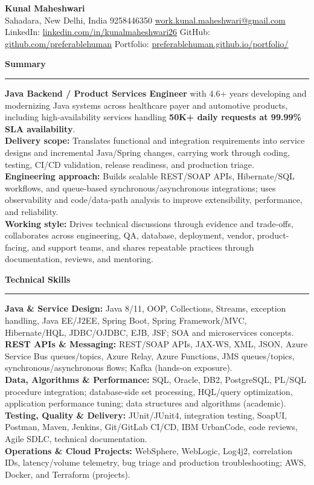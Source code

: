 \documentclass[11pt,letterpaper]{article}
\newcommand{\ressection}[1]{\Needspace{6\baselineskip}\vspace{8pt}\par\textbf{#1}\par\vspace{2pt}\hrule\vspace{5pt}}
\begin{document}
\pagestyle{empty}\raggedright\fontsize{11}{12.5}\selectfont

{\Large \textbf{Kunal Maheshwari}}\\
Sahadara, New Delhi, India \textbar{} 9258446350 \textbar{} \href{mailto:work.kunal.maheshwari@gmail.com}{work.kunal.maheshwari@gmail.com}\\
LinkedIn: \href{https://www.linkedin.com/in/kunalmaheshwari26}{linkedin.com/in/kunalmaheshwari26} \textbar{} GitHub: \href{https://github.com/preferablehuman}{github.com/preferablehuman} \textbar{} Portfolio: \href{https://preferablehuman.github.io/portfolio/}{preferablehuman.github.io/portfolio/}

\ressection{Summary}
\textbf{Java Backend / Product Services Engineer} with 4.6+ years developing and modernizing Java systems across healthcare payer and automotive products, including high-availability services handling \textbf{50K+ daily requests at 99.99\% SLA availability}.\\[2pt]
\textbf{Delivery scope:} Translates functional and integration requirements into service designs and incremental Java/Spring changes, carrying work through coding, testing, CI/CD validation, release readiness, and production triage.\\[2pt]
\textbf{Engineering approach:} Builds scalable REST/SOAP APIs, Hibernate/SQL workflows, and queue-based synchronous/asynchronous integrations; uses observability and code/data-path analysis to improve extensibility, performance, and reliability.\\[2pt]
\textbf{Working style:} Drives technical discussions through evidence and trade-offs, collaborates across engineering, QA, database, deployment, vendor, product-facing, and support teams, and shares repeatable practices through documentation, reviews, and mentoring.

\ressection{Technical Skills}
\textbf{Java \& Service Design:} Java 8/11, OOP, Collections, Streams, exception handling, Java EE/J2EE, Spring Boot, Spring Framework/MVC, Hibernate/HQL, JDBC/OJDBC, EJB, JSF; SOA and microservices concepts.\\
\textbf{REST APIs \& Messaging:} REST/SOAP APIs, JAX-WS, XML, JSON, Azure Service Bus queues/topics, Azure Relay, Azure Functions, JMS queues/topics, synchronous/asynchronous flows; Kafka (hands-on exposure).\\
\textbf{Data, Algorithms \& Performance:} SQL, Oracle, DB2, PostgreSQL, PL/SQL procedure integration; database-side set processing, HQL/query optimization, application performance tuning; data structures and algorithms (academic).\\
\textbf{Testing, Quality \& Delivery:} JUnit/JUnit4, integration testing, SoapUI, Postman, Maven, Jenkins, Git/GitLab CI/CD, IBM UrbanCode, code reviews, Agile SDLC, technical documentation.\\
\textbf{Operations \& Cloud Projects:} WebSphere, WebLogic, Log4j2, correlation IDs, latency/volume telemetry, bug triage and production troubleshooting; AWS, Docker, and Terraform (projects).
\end{document}
